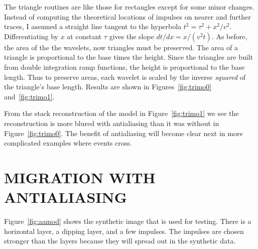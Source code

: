 The triangle routines are like those for rectangles
except for some minor changes.
Instead of computing the theoretical locations
of impulses on nearer and further traces,
I assumed a straight line tangent to the hyperbola
$t^2 = \tau^2+x^2/v^2$.
Differentiating by $x$ at constant $\tau$ gives the slope
$dt/dx= x/(v^2t)$.
As before, the area of the the wavelets, now triangles must be preserved.
The area of a triangle is proportional to the base times the height.
Since the triangles are built from double integration ramp functions,
the height is proportional to the base length.
Thus to preserve areas, each wavelet is scaled by the inverse {\em  squared}
of the triangle's base length.
Results are shown in
Figures~\ref{fig:trimo0} and~\ref{fig:trimo1}.

\begin{comment}
\progdex{tristack}{stack with triangle footprint} 

\progdex{trimo}{triangle footprint}
\end{comment}

From the stack reconstruction of the model in Figure~\ref{fig:trimo1}
we see the reconstruction is more blured with antialiasing
than it was without in Figure~\ref{fig:trimo0}.
The benefit of antialiasing will become clear next
in more complicated examples where events cross.

\section{MIGRATION WITH ANTIALIASING}


\begin{comment}
Subroutine {\tt aamig()} below does migration and diffraction modeling
using subroutine {\tt trimo()} as the workhorse. %
\progdex{aamig}{antialias migration} %
\end{comment}
Figure~\ref{fig:aamod} shows the synthetic image
that is used for testing.
There is a horizontal layer, a dipping layer, and a few impulses.
The impulses are chosen stronger than the layers because
they will spread out in the synthetic data.

